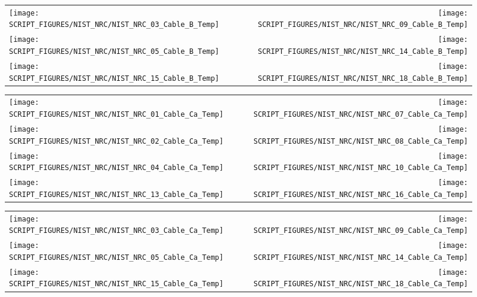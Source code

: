 \begin{figure}[p]
\begin{tabular*}{\textwidth}{l@{\extracolsep{\fill}}r}
\texttt{[image: SCRIPT\_FIGURES/NIST\_NRC/NIST\_NRC\_03\_Cable\_B\_Temp]} &
\texttt{[image: SCRIPT\_FIGURES/NIST\_NRC/NIST\_NRC\_09\_Cable\_B\_Temp]} \\
\texttt{[image: SCRIPT\_FIGURES/NIST\_NRC/NIST\_NRC\_05\_Cable\_B\_Temp]} &
\texttt{[image: SCRIPT\_FIGURES/NIST\_NRC/NIST\_NRC\_14\_Cable\_B\_Temp]} \\
\texttt{[image: SCRIPT\_FIGURES/NIST\_NRC/NIST\_NRC\_15\_Cable\_B\_Temp]} &
\texttt{[image: SCRIPT\_FIGURES/NIST\_NRC/NIST\_NRC\_18\_Cable\_B\_Temp]}
\end{tabular*}
\label{NIST_NRC_Cable_B_Open}
\end{figure}

\begin{figure}[p]
\begin{tabular*}{\textwidth}{l@{\extracolsep{\fill}}r}
\texttt{[image: SCRIPT\_FIGURES/NIST\_NRC/NIST\_NRC\_01\_Cable\_Ca\_Temp]} &
\texttt{[image: SCRIPT\_FIGURES/NIST\_NRC/NIST\_NRC\_07\_Cable\_Ca\_Temp]} \\
\texttt{[image: SCRIPT\_FIGURES/NIST\_NRC/NIST\_NRC\_02\_Cable\_Ca\_Temp]} &
\texttt{[image: SCRIPT\_FIGURES/NIST\_NRC/NIST\_NRC\_08\_Cable\_Ca\_Temp]} \\
\texttt{[image: SCRIPT\_FIGURES/NIST\_NRC/NIST\_NRC\_04\_Cable\_Ca\_Temp]} &
\texttt{[image: SCRIPT\_FIGURES/NIST\_NRC/NIST\_NRC\_10\_Cable\_Ca\_Temp]} \\
\texttt{[image: SCRIPT\_FIGURES/NIST\_NRC/NIST\_NRC\_13\_Cable\_Ca\_Temp]} &
\texttt{[image: SCRIPT\_FIGURES/NIST\_NRC/NIST\_NRC\_16\_Cable\_Ca\_Temp]}
\end{tabular*}
\label{NIST_NRC_Cable_Ca_Closed}
\end{figure}

\begin{figure}[p]
\begin{tabular*}{\textwidth}{l@{\extracolsep{\fill}}r}
\texttt{[image: SCRIPT\_FIGURES/NIST\_NRC/NIST\_NRC\_03\_Cable\_Ca\_Temp]} &
\texttt{[image: SCRIPT\_FIGURES/NIST\_NRC/NIST\_NRC\_09\_Cable\_Ca\_Temp]} \\
\texttt{[image: SCRIPT\_FIGURES/NIST\_NRC/NIST\_NRC\_05\_Cable\_Ca\_Temp]} &
\texttt{[image: SCRIPT\_FIGURES/NIST\_NRC/NIST\_NRC\_14\_Cable\_Ca\_Temp]} \\
\texttt{[image: SCRIPT\_FIGURES/NIST\_NRC/NIST\_NRC\_15\_Cable\_Ca\_Temp]} &
\texttt{[image: SCRIPT\_FIGURES/NIST\_NRC/NIST\_NRC\_18\_Cable\_Ca\_Temp]}
\end{tabular*}
\label{NIST_NRC_Cable_Ca_Open}
\end{figure}

